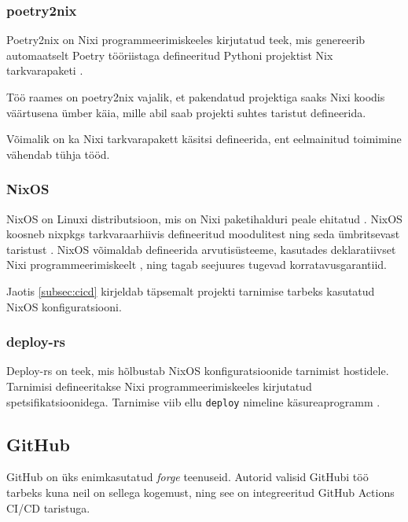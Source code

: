 \subsubsection{poetry2nix}\label{subsubsec:poetry2nix}

Poetry2nix on Nixi programmeerimiskeeles kirjutatud teek, mis genereerib automaatselt Poetry tööriistaga defineeritud Pythoni projektist Nix tarkvarapaketi \cite{poetry2nix-repo}.

Töö raames on poetry2nix vajalik, et pakendatud projektiga saaks Nixi koodis väärtusena ümber käia, mille abil saab projekti suhtes taristut defineerida.

Võimalik on ka Nixi tarkvarapakett käsitsi defineerida, ent eelmainitud toimimine vähendab tühja tööd.

\subsubsection{NixOS}

NixOS on Linuxi distributsioon, mis on Nixi paketihalduri peale ehitatud \cite{nixos-manual-preface}. NixOS koosneb nixpkgs tarkvaraarhiivis defineeritud moodulitest ning seda ümbritsevast taristust \cite{nixos-manual-preface}. NixOS võimaldab defineerida arvutisüsteeme, kasutades deklaratiivset Nixi programmeerimiskeelt \cite{nixos-manual-configuration}, ning tagab seejuures tugevad korratavusgarantiid.

Jaotis \ref{subsec:cicd} kirjeldab täpsemalt projekti tarnimise tarbeks kasutatud NixOS konfiguratsiooni.

\subsubsection{deploy-rs}\label{subsubsec:deploy-rs}

Deploy-rs on teek, mis hõlbustab NixOS konfiguratsioonide tarnimist hostidele. Tarnimisi defineeritakse Nixi programmeerimiskeeles kirjutatud spetsifikatsioonidega. Tarnimise viib ellu \texttt{deploy} nimeline käsureaprogramm \cite{deploy-rs}.

\subsection{GitHub}

GitHub on üks enimkasutatud \emph{forge} teenuseid. Autorid valisid GitHubi töö tarbeks kuna neil on sellega kogemust, ning see on integreeritud GitHub Actions CI/CD taristuga.

